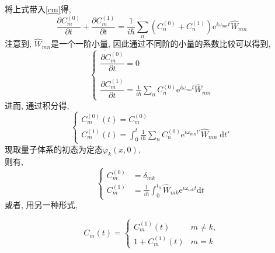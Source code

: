 \documentclass[a4paper, 11pt]{article}
\begin{document}
\begin{spacing}{1.2}
          将上式带入\eqref{cm}得,
          \begin{equation} 
            \frac{\partial C_m^{(0)}}{\partial t} 
            + \frac{\partial C_m^{(1)}}{\partial t}
            = \frac{1}{i\hbar}\sum_n (C_n^{(0)} +  C_n^{(1)})
            \mathrm{e}^{i\omega_{mn}t} \hat{W}_{mn}
          \end{equation}
          注意到, $\hat{W}_{mn}$是一个一阶小量, 因此通过不同阶的小量的系数比较可以得到,
          \begin{equation}
            \begin{cases}
              \dfrac{\partial C_m^{(0)}}{\partial t} = 0\\
              \\
              \dfrac{\partial C_m^{(1)}}{\partial t} = 
              \frac{1}{i\hbar}\sum_n C_n^{(0)}
              \mathrm{e}^{i\omega_{mn}t} \hat{W}_{mn}
            \end{cases}
          \end{equation}
          进而, 通过积分得,
          \begin{equation}
            \label{Cm1}
            \begin{cases}
              C_m^{(0)}(t) = C_m^{(0)}\\
              C_m^{(1)}(t)= \int_0^{t}\frac{1}{i\hbar}\sum_n C_n^{(0)}
              \mathrm{e}^{i\omega_{mn}t'} \hat{W}_{mn} \; \mathrm{d}t'
            \end{cases}
          \end{equation}
          现取量子体系的初态为定态$\varphi_k(x, 0)$,\\
          则有, 
          \begin{equation}
            \begin{cases} 
              C_m^{(0)} & = \delta_{mk} \\ 
              C_m^{(1)} & = \frac{1}{i\hbar}\int_0^{t_0}
                            \hat{W}_{mk}
                            \mathrm{e}^{i\omega_{mk}t} \mathrm{d}t 
            \end{cases}
          \end{equation}
          或者, 用另一种形式, 
          
          \begin{equation}
            \label{cmk}
            C_m(t) = 
            \begin{cases}
              C_m^{(1)}(t) & m \ne k, \\
              1 + C_m^{(1)}(t) &  m = k 
            \end{cases}
         \end{equation}


\end{spacing}
\end{document}
